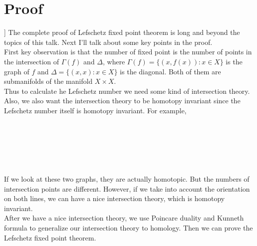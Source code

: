 \documentclass[psamsfonts]{amsart}
\theoremstyle{definition}
\theoremstyle{remark}
\numberwithin{equation}{section}
\begin{document}
		\section{Proof}]
			The complete proof of Lefschetz fixed point theorem is long and beyond the topics of this talk. Next I'll talk about some key points in the proof.\\
			\indent First key observation is that the number of fixed point is the number of points in the intersection of $\Gamma(f)$ and $\Delta$, where $\Gamma (f) = \{(x,f(x)): x \in X\}$ is the graph of $f$ and $\Delta = \{ (x,x): x \in X \}$ is the diagonal. Both of them are submanifolds of the manifold $X \times X$.\\
			\indent Thus to calculate he Lefschetz number we need some kind of intersection theory. Also, we also want the intersection theory to be homotopy invariant since the Lefschetz number itself is homotopy invariant. For example, \\ \\ \\ \\ \\ \\ \\
			\indent If we look at these two graphs, they are actually homotopic. But the numbers of intersection points are different. However, if we take into account the orientation on both lines, we can have a nice intersection theory, which is homotopy invariant.\\
			\indent After we have a nice intersection theory, we use Poincare duality and Kunneth formula to generalize our intersection theory to homology. Then we can prove the Lefschetz fixed point theorem.
\end{document}
